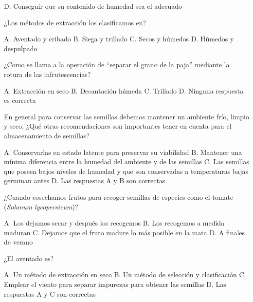 \documentclass[11pt]{exam}
\begin{document}
{\begin{questions}
\begin{checkboxes}
    \choice D. Conseguir que su contenido de humedad sea el adecuado
  \end{checkboxes}
\question ¿Los métodos de extracción los clasificamos en?
  \begin{checkboxes}
    \choice A. Aventado y cribado
    \choice B. Siega y trillado
    \CorrectChoice C. Secos y húmedos
    \choice D. Húmedos y despulpado
  \end{checkboxes}
  \newpage
\question ¿Como se llama a la operación de ``separar el grano de la paja'' mediante la
  rotura de las infrutescencias?
  \begin{checkboxes}
    \choice A. Extracción en seco
    \choice B. Decantación húmeda
    \CorrectChoice C. Trillado
    \choice D. Ninguna respuesta es correcta 
  \end{checkboxes}
\question En general para conservar las semillas debemos mantener un ambiente frío, limpio
  y seco. ¿Qué otras recomendaciones son importantes tener en cuenta para el
  almacenamiento de semillas?
  \begin{checkboxes}
    \choice A. Conservarlas en estado latente para preservar su viabilidad
    \choice B. Mantener una mínima diferencia entre la humedad del ambiente y de las
    semillas
    \choice C. Las semillas que poseen bajos niveles de humedad y que son conservadas a
    temperaturas bajas germinan antes
    \CorrectChoice D. Las respuestas A y B son correctas
  \end{checkboxes}
\question ¿Cuando cosechamos frutos para recoger semillas de especies como el
  tomate (\emph{Solanum lycopersicum})?
  \begin{checkboxes}
    \choice A. Los dejamos secar y después los recogemos
    \choice B. Los recogemos a medida maduran
    \CorrectChoice C. Dejamos que el fruto madure lo más posible en la mata 
    \choice D. A finales de verano
  \end{checkboxes}
\question ¿El aventado es?
  \begin{checkboxes}
    \choice A. Un método de extracción en seco
    \choice B. Un método de selección y clasificación
    \choice C. Emplear el viento para separar impurezas para obtener las semillas
    \CorrectChoice D. Las respuestas A y C son correctas
  \end{checkboxes}
\end{questions}}
\end{document}
